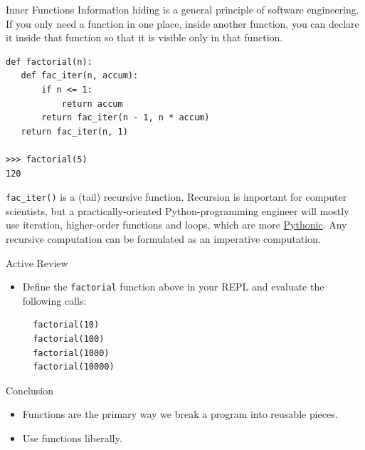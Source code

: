 \documentclass[smaller, aspectratio=1610]{beamer}
\begin{document}
\begin{frame}[label={sec:org55150e0},fragile]{Inner Functions}
 Information hiding is a general principle of software engineering. If you only need a function in one place, inside another function, you can declare it inside that function so that it is visible only in that function.

\lstset{language=Python,label= ,caption= ,captionpos=b,numbers=none}
\begin{lstlisting}
def factorial(n):
   def fac_iter(n, accum):
       if n <= 1:
           return accum
       return fac_iter(n - 1, n * accum)
   return fac_iter(n, 1)

>>> factorial(5)
120
\end{lstlisting}

\texttt{fac\_iter()} is a (tail) recursive function. Recursion is important for computer scientists, but a practically-oriented Python-programming engineer will mostly use iteration, higher-order functions and loops, which are more \href{http://neopythonic.blogspot.com/2009/04/tail-recursion-elimination.html}{Pythonic}. Any recursive computation can be formulated as an imperative computation.

\begin{block}{Active Review}
\begin{itemize}
\item Define the \texttt{factorial} function above in your REPL and evaluate the following calls:

\lstset{language=Python,label= ,caption= ,captionpos=b,numbers=none}
\begin{lstlisting}
  factorial(10)
  factorial(100)
  factorial(1000)
  factorial(10000)
\end{lstlisting}
\end{itemize}
\end{block}
\end{frame}

\begin{frame}[label={sec:orgdb0ca43}]{Conclusion}
\begin{itemize}
\item Functions are the primary way we break a program into reusable pieces.
\item Use functions liberally.
\end{itemize}
\end{frame}
\end{document}
